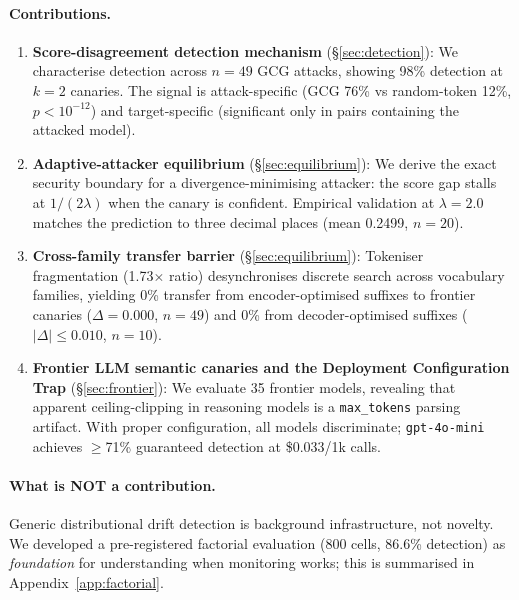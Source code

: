 \documentclass{article}
\begin{document}
\paragraph{Contributions.}
\begin{enumerate}
\item \textbf{Score-disagreement detection mechanism} (\S\ref{sec:detection}): We characterise detection across $n{=}49$ GCG attacks, showing 98\% detection at $k{=}2$ canaries. The signal is attack-specific (GCG 76\% vs random-token 12\%, $p < 10^{-12}$) and target-specific (significant only in pairs containing the attacked model).

\item \textbf{Adaptive-attacker equilibrium} (\S\ref{sec:equilibrium}): We derive the exact security boundary for a divergence-minimising attacker: the score gap stalls at $1/(2\lambda)$ when the canary is confident. Empirical validation at $\lambda{=}2.0$ matches the prediction to three decimal places (mean 0.2499, $n{=}20$).

\item \textbf{Cross-family transfer barrier} (\S\ref{sec:equilibrium}): Tokeniser fragmentation (1.73$\times$ ratio) desynchronises discrete search across vocabulary families, yielding 0\% transfer from encoder-optimised suffixes to frontier canaries ($\Delta = 0.000$, $n{=}49$) and 0\% from decoder-optimised suffixes ($|\Delta| \leq 0.010$, $n{=}10$).

\item \textbf{Frontier LLM semantic canaries and the Deployment Configuration Trap} (\S\ref{sec:frontier}): We evaluate 35 frontier models, revealing that apparent ceiling-clipping in reasoning models is a \texttt{max\_tokens} parsing artifact. With proper configuration, all models discriminate; \texttt{gpt-4o-mini} achieves $\geq$71\% guaranteed detection at \$0.033/1k calls.
\end{enumerate}

\paragraph{What is NOT a contribution.} Generic distributional drift detection is background infrastructure, not novelty. We developed a pre-registered factorial evaluation (800 cells, 86.6\% detection) as \emph{foundation} for understanding when monitoring works; this is summarised in Appendix~\ref{app:factorial}.


\end{document}
